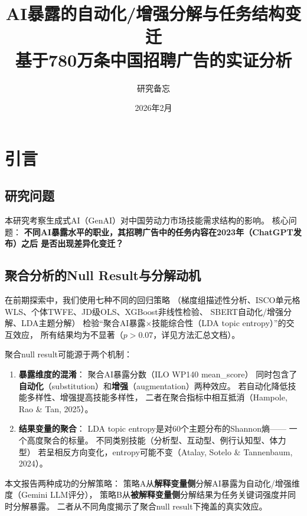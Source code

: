 \documentclass[12pt,a4paper]{ctexart}
\title{\textbf{AI暴露的自动化/增强分解与任务结构变迁}\\[0.5em]
\large 基于780万条中国招聘广告的实证分析}
\author{研究备忘}
\date{2026年2月}
\begin{document}
\maketitle
\tableofcontents
\newpage


\section{引言}
\label{sec:intro}

\subsection{研究问题}

本研究考察生成式AI（GenAI）对中国劳动力市场技能需求结构的影响。
核心问题：
\textbf{不同AI暴露水平的职业，其招聘广告中的任务内容在2023年（ChatGPT发布）之后
是否出现差异化变迁？}

\subsection{聚合分析的Null Result与分解动机}

在前期探索中，我们使用七种不同的回归策略
（梯度组描述性分析、ISCO单元格WLS、个体TWFE、JD级OLS、XGBoost非线性检验、
SBERT自动化/增强分解、LDA主题分解）
检验``聚合AI暴露$\times$技能综合性（LDA topic entropy）''的交互效应，
所有结果均为不显著（$p > 0.07$，详见方法汇总文档）。

聚合null result可能源于两个机制：

\begin{enumerate}
\item \textbf{暴露维度的混淆}：
      聚合AI暴露分数（ILO WP140 mean\_score）
      同时包含了\textbf{自动化}（substitution）和\textbf{增强}（augmentation）两种效应。
      若自动化降低技能多样性、增强提高技能多样性，
      二者在聚合指标中相互抵消（Hampole, Rao \& Tan, 2025）。

\item \textbf{结果变量的聚合}：
      LDA topic entropy是对60个主题分布的Shannon熵——
      一个高度聚合的标量。
      不同类别技能（分析型、互动型、例行认知型、体力型）
      若呈相反方向变化，entropy可能不变（Atalay, Sotelo \& Tannenbaum, 2024）。
\end{enumerate}

本文报告两种成功的分解策略：
策略A从\textbf{解释变量侧}分解AI暴露为自动化/增强维度（Gemini LLM评分），
策略B从\textbf{被解释变量侧}分解结果为任务关键词强度并同时分解暴露。
二者从不同角度揭示了聚合null result下掩盖的真实效应。
\end{document}
